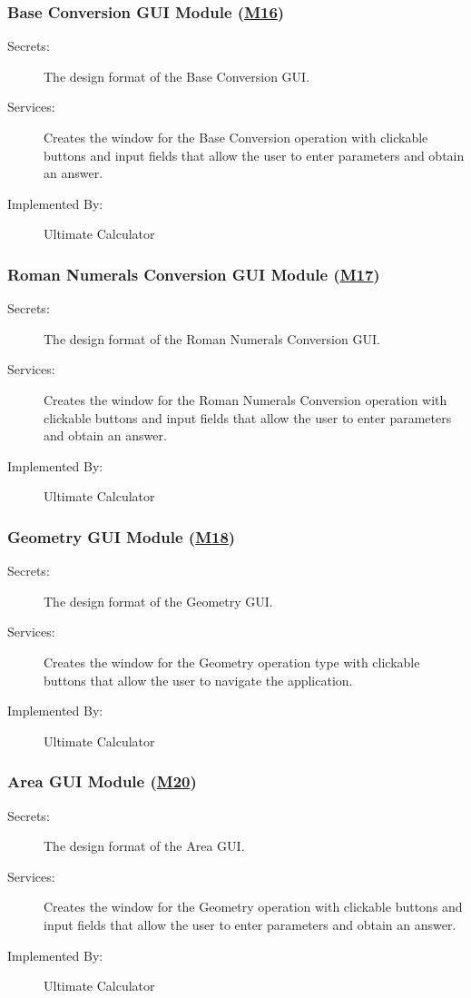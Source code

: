 \documentclass[12pt, titlepage]{article}
\begin{document}
\subsubsection{Base Conversion GUI Module (\hyperref[m16]{M16})}

\begin{description}
\item[Secrets:]The design format of the Base Conversion GUI.
\item[Services:] Creates the window for the Base Conversion operation with clickable buttons and input fields that allow the user to enter parameters and obtain an answer.
\item[Implemented By:] Ultimate Calculator
\end{description}

\subsubsection{Roman Numerals Conversion GUI Module (\hyperref[m17]{M17})}
\begin{description}
\item[Secrets:]The design format of the Roman Numerals Conversion GUI.
\item[Services:] Creates the window for the Roman Numerals Conversion operation with clickable buttons and input fields that allow the user to enter parameters and obtain an answer.
\item[Implemented By:] Ultimate Calculator
\end{description}

\subsubsection{Geometry GUI Module (\hyperref[m18]{M18})}
\begin{description}
\item[Secrets:]The design format of the Geometry GUI.
\item[Services:] Creates the window for the Geometry operation type with clickable buttons that allow the user to navigate the application.
\item[Implemented By:] Ultimate Calculator
\end{description}

\subsubsection{Area GUI Module (\hyperref[m20]{M20})}
\begin{description}
\item[Secrets:]The design format of the Area GUI.
\item[Services:] Creates the window for the Geometry operation with clickable buttons and input fields that allow the user to enter parameters and obtain an answer.
\item[Implemented By:] Ultimate Calculator
\end{description}
\end{document}
